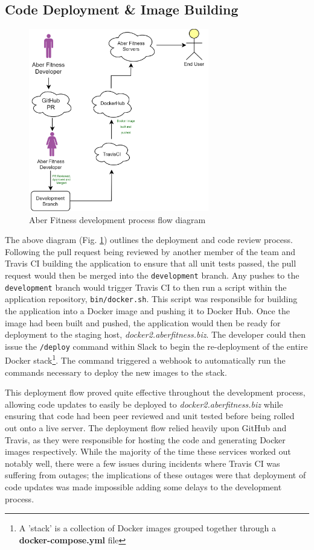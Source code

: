 
\subsection{Code Deployment \& Image Building}
\begin{figure}[H]
    \centering
    \includegraphics[width=0.7\textwidth]{Images/diagram_af.png}
    \caption{Aber Fitness development process flow diagram}
    \label{fig:development_flow_diagram}
\end{figure}

The above diagram (Fig. \ref{fig:development_flow_diagram}) outlines the deployment and code review process. Following the pull request being reviewed by another member of the team and Travis CI building the application to ensure that all unit tests passed, the pull request would then be merged into the \lstinline{development} branch. Any pushes to the \lstinline{development} branch would trigger Travis CI to then run a script within the application repository, \lstinline{bin/docker.sh}. This script was responsible for building the application into a Docker image and pushing it to Docker Hub. Once the image had been built and pushed, the application would then be ready for deployment to the staging host, \textit{docker2.aberfitness.biz}. The developer could then issue the \lstinline{/deploy} command within Slack to begin the re-deployment of the entire Docker stack\footnote{A 'stack' is a collection of Docker images grouped together through a \textbf{docker-compose.yml} file}. The command triggered a webhook to automatically run the commands necessary to deploy the new images to the stack. 

This deployment flow proved quite effective throughout the development process, allowing code updates to easily be deployed to \textit{docker2.aberfitness.biz} while ensuring that code had been peer reviewed and unit tested before being rolled out onto a live server. The deployment flow relied heavily upon GitHub and Travis, as they were responsible for hosting the code and generating Docker images respectively. While the majority of the time these services worked out notably well, there were a few issues during incidents where Travis CI was suffering from outages; the implications of these outages were that deployment of code updates was made impossible \textemdash adding some delays to the development process.


